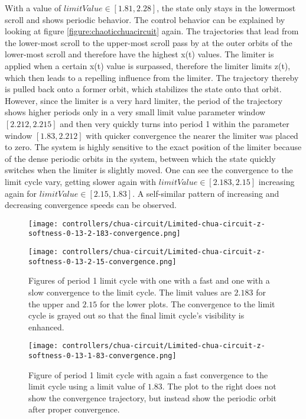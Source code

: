 \documentclass[main]{subfiles}
\begin{document}
With a value of \(limitValue \in [1.81, 2.28]\), the state only stays in the lowermost scroll and shows periodic behavior. %
%
The control behavior can be explained by looking at figure \ref{figure:chaoticchuacircuit} again. %
%
The trajectories that lead from the lower-most scroll to the upper-most scroll pass by at the outer orbits of the lower-most scroll and therefore have the highest x(t) values. %
%
The limiter is applied when a certain x(t) value is surpassed, therefore the limiter limits z(t), which then leads to a repelling influence from the limiter. %
%
The trajectory thereby is pulled back onto a former orbit, which stabilizes the state onto that orbit. %
%
However, since the limiter is a very hard limiter, the period of the trajectory shows higher periods only in a very small limit value parameter window \([2.212,2.215]\) and then very quickly turns into period 1 within the parameter window \([1.83,2.212]\) with quicker convergence the nearer the limiter was placed to zero. %
%
The system is highly sensitive to the exact position of the limiter because of the dense periodic orbits in the system, between which the state quickly switches when the limiter is slightly moved. %
%
One can see the convergence to the limit cycle vary, getting slower again with \(limitValue \in [2.183,2.15]\) increasing again for \(limitValue \in [2.15,1.83]\). %
%
A self-similar pattern of increasing and decreasing convergence speeds can be observed.

\begin{figure}[H]
\centering
\texttt{[image: controllers/chua-circuit/Limited-chua-circuit-z-softness-0-13-2-183-convergence.png]}

\texttt{[image: controllers/chua-circuit/Limited-chua-circuit-z-softness-0-13-2-15-convergence.png]}
\caption[Figure of period 1 limit cycle]{Figures of period 1 limit cycle with one with a fast and one with a slow convergence to the limit cycle. The limit values are \(2.183\) for the upper and \(2.15\) for the lower plots. The convergence to the limit cycle is grayed out so that the final limit cycle's visibility is enhanced.}
\label{figure:z-1-limit-cycle-ctrajectories}
\end{figure}

\begin{figure}[H]
\centering
\texttt{[image: controllers/chua-circuit/Limited-chua-circuit-z-softness-0-13-1-83-convergence.png]}
\caption[Figure of another period 1 limit cycle]{Figure of period 1 limit cycle with again a fast convergence to the limit cycle using a limit value of \(1.83\). The plot to the right does not show the convergence trajectory, but instead show the periodic orbit after proper convergence.}
\label{figure:z-fast-1-limit-cycle-trajectory}
\end{figure}
\end{document}
